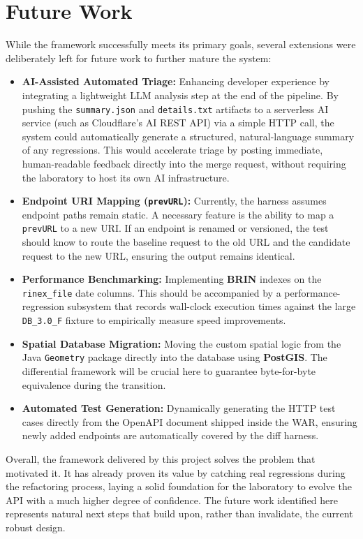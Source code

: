 \section{Future Work}
\label{sec:trab-futuro}

While the framework successfully meets its primary goals, several extensions
were deliberately left for future work to further mature the system:

\begin{itemize}
	\item \textbf{AI-Assisted Automated Triage:} Enhancing developer
		experience by integrating a lightweight \ac{LLM} analysis step at the end
		of the pipeline. By pushing the \texttt{summary.json} and \texttt{details.txt}
		artifacts to a serverless AI service (such as Cloudflare's AI \ac{REST}
		\ac{API}) via a simple \ac{HTTP} call, the system could automatically
		generate a structured, natural-language summary of any regressions.
		This would accelerate triage by posting immediate, human-readable feedback
		directly into the merge request, without requiring the laboratory to
		host its own AI infrastructure.

	\item \textbf{Endpoint URI Mapping (\texttt{prevURL}):} Currently, the harness
		assumes endpoint paths remain static. A necessary feature is the
		ability to map a \texttt{prevURL} to a new \ac{URI}. If an endpoint is renamed
		or versioned, the test should know to route the baseline request to the
		old URL and the candidate request to the new URL, ensuring the output remains
		identical.

	\item \textbf{Performance Benchmarking:} Implementing \textbf{BRIN} indexes
		on the \texttt{rinex\_file} date columns. This should be accompanied by a
		performance-regression subsystem that records wall-clock execution times
		against the large \texttt{DB\_3.0\_F} fixture to empirically measure
		speed improvements.

	\item \textbf{Spatial Database Migration:} Moving the custom spatial
		logic from the Java \texttt{Geometry} package directly into the database
		using \textbf{PostGIS}. The differential framework will be crucial here to
		guarantee byte-for-byte equivalence during the transition.

	\item \textbf{Automated Test Generation:} Dynamically generating the \ac{HTTP}
		test cases directly from the \ac{OpenAPI} document shipped inside the
		\ac{WAR}, ensuring newly added endpoints are automatically covered by
		the diff harness.
\end{itemize}

\bigskip

Overall, the framework delivered by this project solves the problem that
motivated it. It has already proven its value by catching real regressions during
the refactoring process, laying a solid foundation for the laboratory to
evolve the \ac{API} with a much higher degree of confidence. The future
work identified here represents natural next steps that build upon, rather than
invalidate, the current robust design.